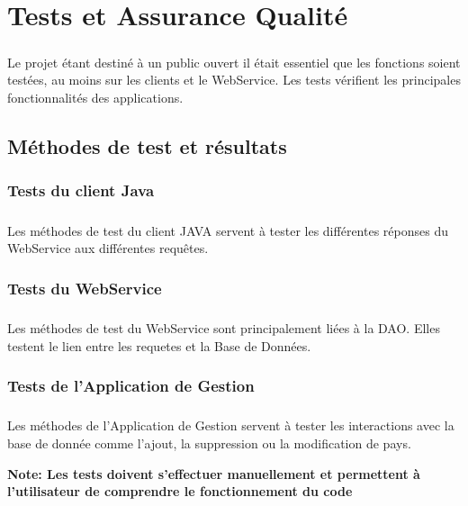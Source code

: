 \chapter{Tests et Assurance Qualité}
\paragraph{} Le projet étant destiné à un public ouvert il était essentiel que les fonctions soient testées, au moins sur les clients et le WebService.
Les tests vérifient les principales fonctionnalités des applications.


\section{Méthodes de test et résultats}
\subsection{Tests du client Java}
\paragraph{} Les méthodes de test du client JAVA servent à tester les différentes réponses du WebService aux différentes requêtes. 


\subsection{Tests du WebService}
\paragraph{} Les méthodes de test du WebService sont principalement liées à la DAO. Elles testent le lien entre les requetes et la Base de Données. 



\subsection{Tests de l'Application de Gestion}
\paragraph{} Les méthodes de l'Application de Gestion servent à tester les interactions avec la base de donnée comme l'ajout, la suppression ou la modification de pays.


\textbf{Note: Les tests doivent s'effectuer manuellement et permettent à l'utilisateur de comprendre le fonctionnement du code}